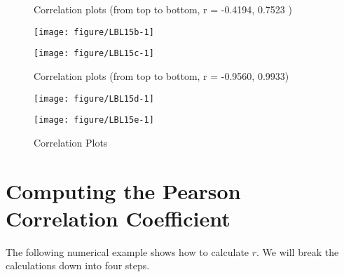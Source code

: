\documentclass[11pt]{book}\usepackage[]{graphicx}\usepackage[]{color}
\begin{document}
\begin{figure}

\caption{Correlation Plots }

\begin{minipage}[ht]{7.1cm}

Correlation plots (from top to bottom, r = -0.4194, 0.7523 )




{\centering \texttt{[image: figure/LBL15b-1]} 

}





{\centering \texttt{[image: figure/LBL15c-1]} 

}




\end{minipage} \hfill
\begin{minipage}[ht]{7.1cm}


Correlation plots (from top to bottom, r = -0.9560, 0.9933)




{\centering \texttt{[image: figure/LBL15d-1]} 

}





{\centering \texttt{[image: figure/LBL15e-1]} 

}



\end{minipage}

\end{figure}

\section{Computing the Pearson Correlation Coefficient}

The following numerical example shows how to calculate $r$.  We will break the calculations down into four steps.
\end{document}
